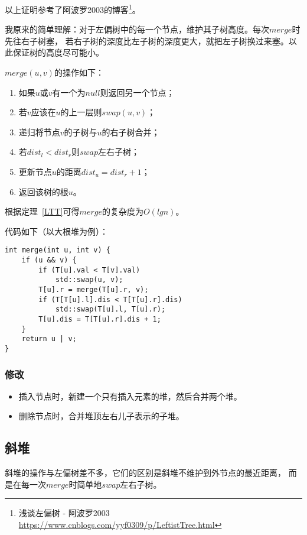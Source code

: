 以上证明参考了阿波罗2003的博客\footnote{
    浅谈左偏树 - 阿波罗2003
    \url{https://www.cnblogs.com/yyf0309/p/LeftistTree.html}
}。

我原来的简单理解：对于左偏树中的每一个节点，维护其子树高度。每次$merge$时先往右子树塞，
若右子树的深度比左子树的深度更大，就把左子树换过来塞。以此保证树的高度尽可能小。

$merge(u,v)$的操作如下：

\begin{enumerate}
    \item 如果$u$或$v$有一个为$null$则返回另一个节点；
    \item 若$v$应该在$u$的上一层则$swap(u,v)$；
    \item 递归将节点$v$的子树与$u$的右子树合并；
    \item 若$dist_l<dist_r$则$swap$左右子树；
    \item 更新节点$u$的距离$dist_u=dist_r+1$；
    \item 返回该树的根$u$。
\end{enumerate}

根据定理~\ref{LTT}可得$merge$的复杂度为$O(lgn)$。

代码如下（以大根堆为例）：

\begin{lstlisting}[title=merge]
int merge(int u, int v) {
    if (u && v) {
        if (T[u].val < T[v].val)
            std::swap(u, v);
        T[u].r = merge(T[u].r, v);
        if (T[T[u].l].dis < T[T[u].r].dis)
            std::swap(T[u].l, T[u].r);
        T[u].dis = T[T[u].r].dis + 1;
    }
    return u | v;
}
\end{lstlisting}

\subsubsection{修改}
\begin{itemize}
    \item 插入节点时，新建一个只有插入元素的堆，然后合并两个堆。
    \item 删除节点时，合并堆顶左右儿子表示的子堆。
\end{itemize}

\subsection{斜堆}
斜堆的操作与左偏树差不多，它们的区别是斜堆不维护到外节点的最近距离，
而是在每一次$merge$时简单地$swap$左右子树。
